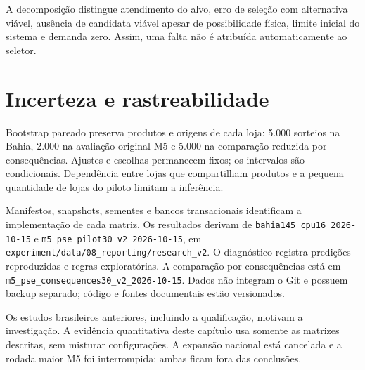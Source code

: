 A decomposição distingue atendimento do alvo, erro de seleção com alternativa viável, ausência de candidata viável apesar de possibilidade física, limite inicial do sistema e demanda zero. Assim, uma falta não é atribuída automaticamente ao seletor.

\section{Incerteza e rastreabilidade}
\label{sec:protocolo_exp}\label{sec:reporting}\label{app:reproducibility}
Bootstrap pareado preserva produtos e origens de cada loja: 5.000 sorteios na Bahia, 2.000 na avaliação original M5 e 5.000 na comparação reduzida por consequências. Ajustes e escolhas permanecem fixos; os intervalos são condicionais. Dependência entre lojas que compartilham produtos e a pequena quantidade de lojas do piloto limitam a inferência.

Manifestos, snapshots, sementes e bancos transacionais identificam a implementação de cada matriz. Os resultados derivam de \nolinkurl{bahia145_cpu16_2026-10-15} e \nolinkurl{m5_pse_pilot30_v2_2026-10-15}, em \nolinkurl{experiment/data/08_reporting/research_v2}. O diagnóstico registra predições reproduzidas e regras exploratórias. A comparação por consequências está em \nolinkurl{m5_pse_consequences30_v2_2026-10-15}. Dados não integram o Git e possuem backup separado; código e fontes documentais estão versionados.

Os estudos brasileiros anteriores, incluindo a qualificação, motivam a investigação. A evidência quantitativa deste capítulo usa somente as matrizes descritas, sem misturar configurações. A expansão nacional está cancelada e a rodada maior M5 foi interrompida; ambas ficam fora das conclusões.
